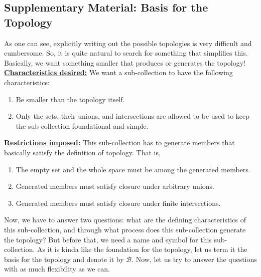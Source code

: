 \subsection{Supplementary Material: Basis for the Topology}
As one can see, explicitly writing out the possible topologies is very difficult and cumbersome. So, it is quite natural to search for something that simplifies this. Basically, we want something smaller that produces or generates the topology!\\
\textbf{\underline{Characteristics desired:}} We want a sub-collection to have the following characteristics:
\begin{enumerate}
    \item Be smaller than the topology itself.
    \item Only the sets, their unions, and intersections are allowed to be used to keep the sub-collection foundational and simple.
\end{enumerate}
\textbf{\underline{Restrictions imposed:}} This sub-collection has to generate members that basically satisfy the definition of topology. That is,
\begin{enumerate}
    \item The empty set and the whole space must be among the generated members.
    \item Generated members must satisfy closure under arbitrary unions.
    \item Generated members must satisfy closure under finite intersections.
\end{enumerate}
Now, we have to answer two questions: what are the defining characteristics of this sub-collection, and through what process does this sub-collection generate the topology? But before that, we need a name and symbol for this sub-collection. As it is kinda like the foundation for the topology, let us term it the basis for the topology and denote it by $\mathcal{B}$. Now, let us try to answer the questions with as much flexibility as we can.\\
